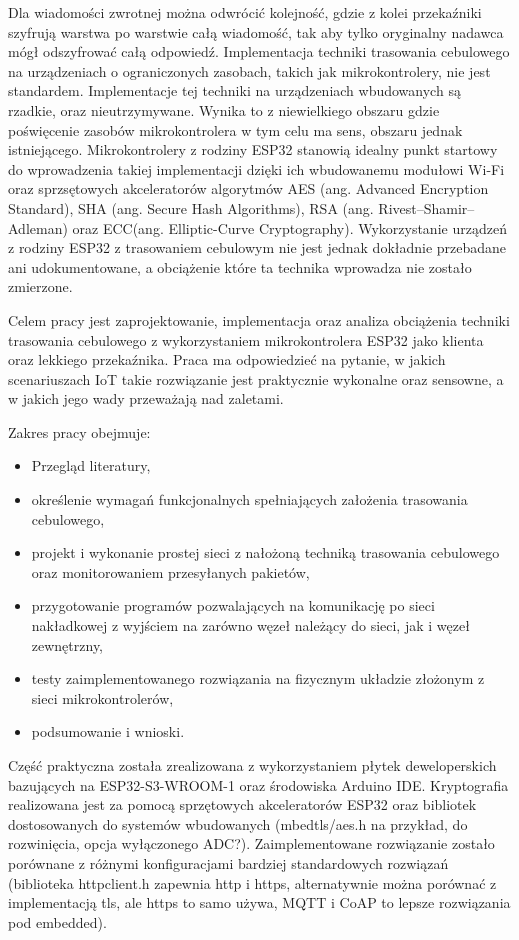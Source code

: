\documentclass[thesis=inz,faculty=ee]{EE-dyplom}
\begin{document}
    Dla wiadomości zwrotnej można odwrócić kolejność, gdzie 
    z kolei przekaźniki szyfrują warstwa po warstwie całą wiadomość, tak aby tylko oryginalny nadawca mógł odszyfrować całą odpowiedź. Implementacja techniki trasowania
    cebulowego na urządzeniach o ograniczonych zasobach, takich jak mikrokontrolery, nie jest standardem\cite{iot_tor_usage}. Implementacje tej techniki na urządzeniach 
    wbudowanych są rzadkie, 
    oraz nieutrzymywane. Wynika to z niewielkiego obszaru gdzie poświęcenie zasobów mikrokontrolera w tym celu ma sens, obszaru jednak istniejącego. Mikrokontrolery z rodziny 
    ESP32 stanowią idealny punkt startowy do wprowadzenia takiej implementacji dzięki ich wbudowanemu modułowi Wi-Fi oraz sprzsętowych akceleratorów algorytmów AES (ang. 
    Advanced Encryption Standard), SHA (ang. Secure Hash Algorithms), RSA (ang. Rivest–Shamir–Adleman)
    oraz ECC(ang. Elliptic-Curve Cryptography)\cite{esp32_datasheet}. Wykorzystanie urządzeń z rodziny ESP32 z trasowaniem cebulowym nie jest jednak dokładnie 
    przebadane ani udokumentowane, a obciążenie które ta technika wprowadza nie zostało zmierzone. 
    
    Celem pracy jest zaprojektowanie, implementacja oraz analiza obciążenia techniki trasowania cebulowego z wykorzystaniem mikrokontrolera ESP32 jako klienta oraz lekkiego 
    przekaźnika. Praca ma odpowiedzieć na pytanie, w jakich scenariuszach IoT takie rozwiązanie jest praktycznie wykonalne oraz sensowne, a w jakich jego wady przeważają nad
    zaletami. 

    Zakres pracy obejmuje: 
    \begin{itemize}
        \item Przegląd literatury,
        \item określenie wymagań funkcjonalnych spełniających założenia trasowania cebulowego,
        \item projekt i wykonanie prostej sieci z nałożoną techniką trasowania cebulowego oraz monitorowaniem przesyłanych pakietów,
        \item przygotowanie programów pozwalających na komunikację po sieci nakładkowej z wyjściem na zarówno węzeł należący do sieci, jak i węzeł zewnętrzny,
        \item testy zaimplementowanego rozwiązania na fizycznym układzie złożonym z sieci mikrokontrolerów, 
        \item podsumowanie i wnioski.
    \end{itemize}

    Część praktyczna została zrealizowana z wykorzystaniem płytek deweloperskich bazujących na ESP32-S3-WROOM-1\cite{s3_wroom_datasheet} oraz środowiska Arduino 
    IDE\cite{ide_docs}. Kryptografia realizowana jest
    za pomocą sprzętowych akceleratorów ESP32 oraz bibliotek dostosowanych do systemów wbudowanych (mbedtls/aes.h\cite{aes_lib} na przykład, 
    do rozwinięcia, opcja wyłączonego ADC?). 
    Zaimplementowane rozwiązanie zostało porównane z różnymi konfiguracjami bardziej standardowych rozwiązań (biblioteka httpclient.h zapewnia http i https, alternatywnie można
    porównać z implementacją tls, ale https to samo używa, MQTT i CoAP to lepsze rozwiązania pod embedded).
    
\end{document}
